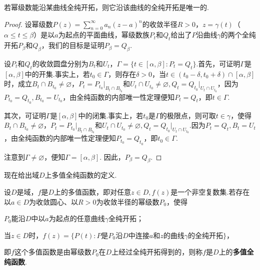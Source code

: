 \begin{prop}\label{prop6.3.4}
若幂级数能沿某曲线全纯开拓，则它沿该曲线的全纯开拓是唯一的.
\end{prop}
\begin{proof}
设幂级数$P(z)=\sum_{n=0}^\infty a_n(z-a)^n$的收敛半径$R>0$，$z=\gamma(t)$（$\alpha\le t\le\beta$）是以$a$为起点的平面曲线，幂级数族$P_t$和$Q_t$给出了$P$沿曲线$\gamma$的两个全纯开拓$P_\beta$和$Q_\beta$，我们的目标是证明$P_\beta=Q_\beta$.

设$P_t$和$Q_t$的收敛圆盘分别为$B_t$和$U_t$，$\Gamma=\{t\in[\alpha,\beta]:P_t=Q_t\}$.首先，可证明$\Gamma$是$[\alpha,\beta]$中的开集.事实上，若$t_0\in\Gamma$，则存在$\delta>0$，当$t\in(t_0-\delta,t_0+\delta)\cap[\alpha,\beta]$时，成立$B_t\cap B_{t_0}\ne\varnothing$，$P_t=P_{t_0}\big|_{B_t\cap B_{t_0}}$和$U_t\cap U_{t_0}\ne\varnothing,Q_t=Q_{t_0}\big|_{U_t\cap U_{t_0}}$，因为$P_{t_0}=Q_{t_0},B_{t_0}=U_{t_0}$，由全纯函数的内部唯一性定理便知$P_t=Q_t$，即$t\in\Gamma$.

其次，可证明$\Gamma$是$[\alpha,\beta]$中的闭集.事实上，若$t_0$是$\Gamma$的极限点，则可取$t\in\gamma$，使得$B_t\cap B_{t_0}\ne\varnothing$，$P_t=P_{t_0}\big|_{B_t\cap B_{t_0}}$和$U_t\cap U_{t_0}\ne\varnothing,Q_t=Q_{t_0}\big|_{U_t\cap U_{t_0}}$.因为$P_t=Q_t,B_t=U_t$，由全纯函数的内部唯一性定理便知$P_{t_0}=Q_{t_0}$，即$t_0\in\Gamma$.

注意到$\Gamma\ne\varnothing$，便知$\Gamma=[\alpha,\beta]$. 因此，$P_\beta=Q_\beta$.
\end{proof}

现在给出域$D$上多值全纯函数的定义.
\begin{definition}\label{def6.3.5}
设$D$是域，$f$是$D$上的多值函数，即对任意$z\in D,f(z)$是一个非空复数集.若存在以$a\in D$为收敛圆心、以$R>0$为收敛半径的幂级数$P_0$，使得
\begin{eenum}
  \item $P_0$能沿$D$中以$a$为起点的任意曲线$\gamma$全纯开拓；
  \item 当$z\in D$时，$f(z)=\{P(t):\mbox{$P$是$P_0$沿$D$中连接$a$和$z$的曲线$\gamma$的全纯开拓}\}$，
\end{eenum}
即$f$这个多值函数是由幂级数$P_0$在$D$上经过全纯开拓得到的，则称$f$是$D$上的\textbf{多值全纯函数}.
\end{definition}

